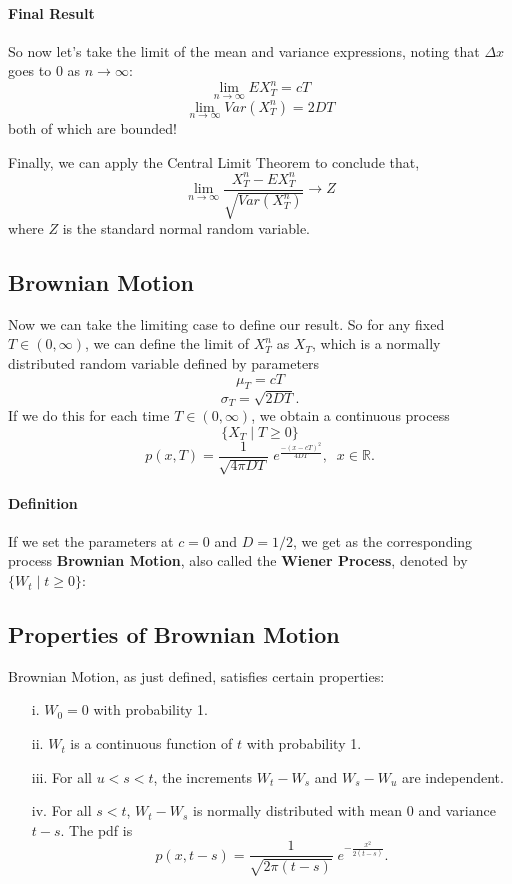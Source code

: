 \documentclass[12pt]{article}
\theoremstyle{plain}
\theoremstyle{definition}
\theoremstyle{remark}
\begin{document}
\paragraph{Final Result} So now let's take the limit of the mean and
variance expressions, noting that $\Delta x$ goes to $0$ as
$n\rightarrow \infty$:
   \[ \lim_{n\rightarrow \infty} EX^n_T = cT  \]
   \[ \lim_{n\rightarrow \infty} Var(X^n_T)= 2DT  \]
both of which are bounded!

Finally, we can apply the Central Limit Theorem to conclude that,
   \[\lim_{n \rightarrow \infty} \frac{X^n_T -
      EX^n_T}{\sqrt{Var(X^n_T)}} \rightarrow Z \]
where $Z$ is the standard normal random variable.

\subsection{Brownian Motion}

Now we can take the limiting case to define our result. So for any fixed
$ T \in (0,\infty)$, we can define the limit of $X^n_T$ as $X_T$, which
is a normally distributed random variable defined by parameters
   \[ \mu_T = cT \]
   \[ \sigma_T = \sqrt{2DT}.\]
If we do this for each time $T \in (0,\infty)$, we obtain a
continuous process
   \[ \{ X_T \; |\; T \geq 0 \}  \]
   \[p(x,T) = \frac{1}{\sqrt{4\pi DT}} \;
      e^{\frac{-(x - cT)^2}{4DT}}, \;\; x \in \mathbb{R}.\]

\paragraph{Definition} If we set the parameters at $c = 0$ and $D = 1/2$,
we get as the corresponding process \textbf{Brownian Motion}, also
called the \textbf{Wiener Process}, denoted by $\{ W_t\;|\; t\geq 0\}$:

\subsection{Properties of Brownian Motion}

Brownian Motion, as just defined, satisfies certain properties:
\begin{enumerate}
   \item[i.]{$W_0 = 0$ with probability 1.}
   \item[ii.]{$W_t$ is a continuous function of $t$ with probability 1.}
   \item[iii.]{For all $u < s < t$, the increments $W_t - W_s$ and
      $W_s - W_u$ are independent.}
   \item[iv.]{For all $s <t$, $W_t - W_s$ is normally distributed with
      mean $0$ and variance $t-s$.  The pdf is
      \[ p(x,t-s) =  \frac{1}{\sqrt{2\pi (t-s)}} \;
	 e^{-\frac{x^2}{2(t-s)}}.\]
      }
\end{enumerate}
\end{document}
